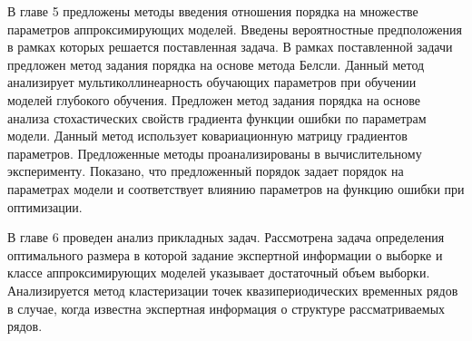 В главе 5 предложены методы введения отношения порядка на множестве параметров аппроксимирующих моделей. Введены вероятностные предположения в рамках которых решается поставленная задача. В рамках поставленной задачи предложен метод задания порядка на основе метода Белсли. Данный метод анализирует мультиколлинеарность обучающих параметров при обучении моделей глубокого обучения. Предложен метод задания порядка на основе анализа стохастических свойств градиента функции ошибки по параметрам модели. Данный метод использует ковариационную матрицу градиентов параметров. Предложенные методы проанализированы в вычислительному эксперименту. Показано, что предложенный порядок задает порядок на параметрах модели и соответствует влиянию параметров на функцию ошибки при оптимизации.

В главе 6 проведен анализ прикладных задач. Рассмотрена задача определения оптимального размера в которой задание экспертной информации о выборке и классе аппроксимирующих моделей указывает достаточный объем выборки. Анализируется метод кластеризации точек квазипериодических временных рядов в случае, когда известна экспертная информация о структуре рассматриваемых рядов.